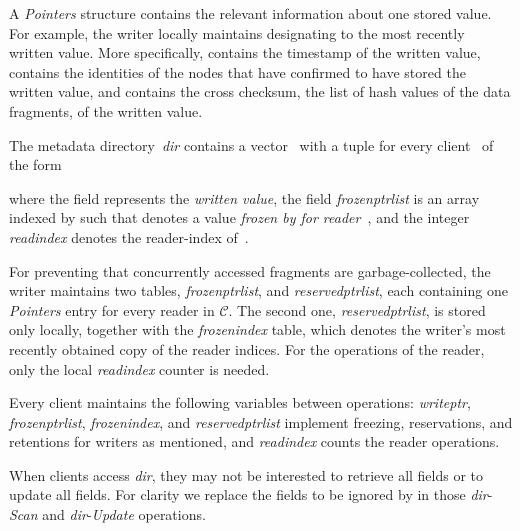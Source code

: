 \documentclass[oribibl]{llncs}
\theoremstyle{definition-boldhead}
\newcommand{\var}[1]{\textit{#1}}
\newcommand{\op}[1]{\textsl{#1}}
\newcommand{\clientset}{\ensuremath{\mathcal{C}}\xspace}
\newcommand{\dir}{\var{dir}\xspace}
\newcommand{\nodes}{nodes\xspace}
\begin{document}
A \var{Pointers} structure contains the relevant information about one
stored value.  For example, the writer locally maintains
 designating to the most recently
written value.  More specifically,  contains
the timestamp of the written value, 
contains the identities of the \nodes that have confirmed to have
stored the written value, and  contains the
cross checksum, the list of hash values of the data fragments, of
the written value.


The metadata directory~\var{dir} contains a vector~ with a tuple
for every client~ of the form

where the field  represents the
\emph{written value}, the field \var{frozenptrlist} is an array
indexed by  such that  denotes a value \emph{frozen by  for reader~},
and the integer \var{readindex} denotes the reader-index of~.

For preventing that concurrently accessed fragments are
garbage-collected, the writer maintains two tables,
\var{frozenptrlist}, and \var{reservedptrlist}, each containing one
\var{Pointers} entry for every reader in \clientset.  The second one,
\var{reservedptrlist}, is stored only locally, together with the
\var{frozenindex} table, which denotes the writer's most recently
obtained copy of the reader indices.  For the operations of the
reader, only the local \var{readindex} counter is needed.

Every client maintains the following variables between operations:
\var{writeptr}, \var{frozenptrlist}, \var{frozenindex}, and
\var{reservedptrlist} implement freezing, reservations, and retentions
for writers as mentioned, and \var{readindex} counts the reader
operations.

When clients access \dir, they may not be interested to retrieve all
fields or to update all fields.  For clarity we replace the fields to
be ignored by  in those \dir-\op{Scan} and \dir-\op{Update}
operations.
\end{document}
